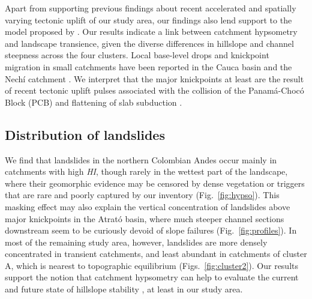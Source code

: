 \documentclass[draft]{agujournal2019}
\begin{document}
\par Apart from supporting previous findings about recent accelerated and spatially varying tectonic uplift of our study area, our findings also lend support to the model proposed by . Our results indicate a link between catchment hypsometry and landscape transience, given the diverse differences in hillslope and channel steepness across the four clusters. Local base-level drops and knickpoint migration in small catchments have been reported in the Cauca basin and the Nechí catchment \cite{perez2021,aristizabal2008,Noriega2020}. We interpret that the major knickpoints at least are the result of recent tectonic uplift pulses associated with the collision of the Panamá-Chocó Block (PCB) and flattening of slab subduction \cite{ott2023}.

\subsection{Distribution of landslides}

\par We find that landslides in the northern Colombian Andes occur mainly in catchments with high \textit{HI}, though rarely in the wettest part of the landscape, where their geomorphic evidence may be censored by dense vegetation or triggers that are rare and poorly captured by our inventory (Fig.~\ref{fig:hypso}). This masking effect may also explain the vertical concentration of landslides above major knickpoints in the Atrató basin, where much steeper channel sections downstream seem to be curiously devoid of slope failures (Fig.~\ref{fig:profiles}). In most of the remaining study area, however, landslides are more densely concentrated in transient catchments, and least abundant in catchments of cluster A, which is nearest to topographic equilibrium (Figs.~\ref{fig:cluster2}). Our results support the notion that catchment hypsometry can help to evaluate the current and future state of hillslope stability \cite{Gallen2011}, at least in our study area.
\end{document}
